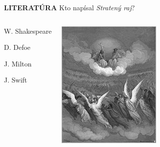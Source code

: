 \documentclass[dvipsnames]{beamer}
\begin{document}
\begin{frame}
	\textbf{LITERATÚRA}
	\vskip 3mm
	Kto  napísal \textit{Stratený raj}?
	\begin{columns}
		\begin{enumerate}
			\item W. Shakespeare
			\item D. Defoe
			      \textcolor{g}{\item[\textcolor{g}{3.}] J. Milton}\setcounter{enumi}{3}

			\item J. Swift

		\end{enumerate}
		\includegraphics[scale=0.75]{lost}

	\end{columns}
\end{frame}
\end{document}

